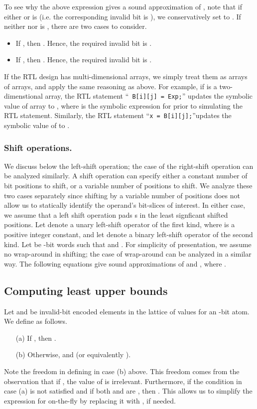 \documentclass{llncs}
\begin{document}
To see why the above expression gives a sound approximation of
, note that if either  or  is
 (i.e. the corresponding invalid bit is ), we
conservatively set  to .  If neither
 nor  is , there are two cases to
consider.
\begin{itemize}
\item If , then
  .  Hence, the required invalid bit is
  .
\item If , then
  . Hence, the
  required invalid bit is .
\end{itemize}
If the RTL design has multi-dimensional arrays, we simply treat them as arrays of
arrays, and apply the same reasoning as above.  For example, if
 is a two-dimenstional array, the RTL statement ``{\tt
  B[i][j] = Exp;}'' updates the symbolic value of array 
to , where  is the
symbolic expression for  prior to simulating the RTL statement.
Similarly, the RTL statement ``{\tt x = B[i][j];}''updates the
symbolic value of  to .

\subsubsection{Shift operations.} We discuss below the
left-shift operation; the case of the right-shift operation can be
analyzed similarly.  A shift operation can specify either a constant
number of bit positions to shift, or a variable number of positions to
shift.  We analyze these two cases separately since shifting by a
variable number of positions does not allow us to statically identify
the operand's bit-slices of interest.  In either case, we assume that
a left shift operation pads s in the least signficant shifted
positions.  Let  denote a unary left-shift operator of the
first kind, where  is a positive integer constant, and let 
denote a binary left-shift operator of the second kind.  Let  be -bit words such that  and .
For simplicity of presentation, we assume no wrap-around in shifting;
the case of wrap-around can be analyzed in a similar way.  The
following equations give sound approximations of  and
, where .
\vspace*{-0.03in}



\subsection{Computing least upper bounds}\label{subsec:lub}
Let  and  be
invalid-bit encoded elements in the lattice of values for an
-bit atom.  We define  as follows.
  \begin{itemize}
    \item[(a)] If , then .
    \item[(b)] Otherwise,  and
       (or
      equivalently ).
  \end{itemize}
Note the freedom in defining  in case (b) above.  This
freedom comes from the observation that if , the
value of  is irrelevant.  Furthermore, if the condition in
case (a) is not satisfied and if both  and  are
, then .  This allows us to simplify
the expression for  on-the-fly by replacing it with
, if needed.  
\end{document}
